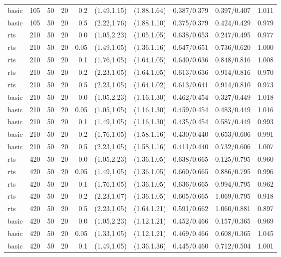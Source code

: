 \begin{tabular}{llrrrccccc}
basic & 105 & 50 & 20 & 0.2 & (1.49,1.15) & (1.88,1.64) & 0.387/0.379 & 0.397/0.407 & 1.011 \\
basic & 105 & 50 & 20 & 0.5 & (2.22,1.76) & (1.88,1.10) & 0.375/0.379 & 0.424/0.429 & 0.979 \\
rts & 210 & 50 & 20 & 0.0 & (1.05,2.23) & (1.05,1.05) & 0.638/0.653 & 0.247/0.495 & 0.977 \\
rts & 210 & 50 & 20 & 0.05 & (1.49,1.05) & (1.36,1.16) & 0.647/0.651 & 0.736/0.620 & 1.000 \\
rts & 210 & 50 & 20 & 0.1 & (1.76,1.05) & (1.64,1.05) & 0.640/0.636 & 0.848/0.816 & 1.008 \\
rts & 210 & 50 & 20 & 0.2 & (2.23,1.05) & (1.64,1.05) & 0.613/0.636 & 0.914/0.816 & 0.970 \\
rts & 210 & 50 & 20 & 0.5 & (2.23,1.05) & (1.64,1.02) & 0.613/0.641 & 0.914/0.810 & 0.973 \\
basic & 210 & 50 & 20 & 0.0 & (1.05,2.23) & (1.16,1.30) & 0.462/0.454 & 0.327/0.449 & 1.018 \\
basic & 210 & 50 & 20 & 0.05 & (1.05,1.05) & (1.16,1.30) & 0.459/0.454 & 0.483/0.449 & 1.016 \\
basic & 210 & 50 & 20 & 0.1 & (1.49,1.05) & (1.16,1.30) & 0.435/0.454 & 0.587/0.449 & 0.993 \\
basic & 210 & 50 & 20 & 0.2 & (1.76,1.05) & (1.58,1.16) & 0.430/0.440 & 0.653/0.606 & 0.991 \\
basic & 210 & 50 & 20 & 0.5 & (2.23,1.05) & (1.58,1.16) & 0.411/0.440 & 0.732/0.606 & 1.007 \\
rts & 420 & 50 & 20 & 0.0 & (1.05,2.23) & (1.36,1.05) & 0.638/0.665 & 0.125/0.795 & 0.960 \\
rts & 420 & 50 & 20 & 0.05 & (1.49,1.05) & (1.36,1.05) & 0.660/0.665 & 0.886/0.795 & 0.996 \\
rts & 420 & 50 & 20 & 0.1 & (1.76,1.05) & (1.36,1.05) & 0.636/0.665 & 0.994/0.795 & 0.962 \\
rts & 420 & 50 & 20 & 0.2 & (2.23,1.07) & (1.36,1.05) & 0.605/0.665 & 1.069/0.795 & 0.918 \\
rts & 420 & 50 & 20 & 0.5 & (2.23,1.05) & (1.64,1.21) & 0.591/0.662 & 1.060/0.881 & 0.897 \\
basic & 420 & 50 & 20 & 0.0 & (1.05,2.23) & (1.12,1.21) & 0.452/0.466 & 0.157/0.365 & 0.969 \\
basic & 420 & 50 & 20 & 0.05 & (1.33,1.05) & (1.12,1.21) & 0.469/0.466 & 0.608/0.365 & 1.045 \\
basic & 420 & 50 & 20 & 0.1 & (1.49,1.05) & (1.36,1.36) & 0.445/0.460 & 0.712/0.504 & 1.001 \\

\end{tabular}
